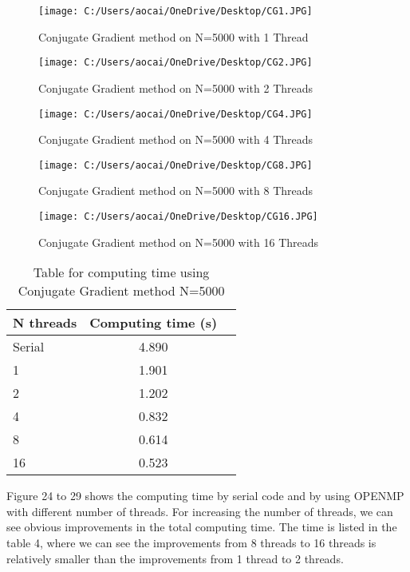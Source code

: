 \documentclass[12pt]{article}
\begin{document}
\begin{figure}[H]
	\centering
	\texttt{[image: C:/Users/aocai/OneDrive/Desktop/CG1.JPG]}
	\caption[Optional caption]{Conjugate Gradient method on N=5000 with 1 Thread}
	\label{fig:CG1}
\end{figure}

\begin{figure}[H]
	\centering
	\texttt{[image: C:/Users/aocai/OneDrive/Desktop/CG2.JPG]}
	\caption[Optional caption]{Conjugate Gradient method on N=5000 with 2 Threads}
	\label{fig:CG2}
\end{figure}

\begin{figure}[H]
	\centering
	\texttt{[image: C:/Users/aocai/OneDrive/Desktop/CG4.JPG]}
	\caption[Optional caption]{Conjugate Gradient method on N=5000 with 4 Threads}
	\label{fig:CG4}
\end{figure}

\begin{figure}[H]
	\centering
	\texttt{[image: C:/Users/aocai/OneDrive/Desktop/CG8.JPG]}
	\caption[Optional caption]{Conjugate Gradient method on N=5000 with 8 Threads}
	\label{fig:CG8}
\end{figure}
\begin{figure}[H]
	\centering
	\texttt{[image: C:/Users/aocai/OneDrive/Desktop/CG16.JPG]}
	\caption[Optional caption]{Conjugate Gradient method on N=5000 with 16 Threads}
	\label{fig:SOR16}
\end{figure}

\begin{table}[H]
	\centering
	\label{tab:sor}
	\begin{tabular}{lcr}
	\bfseries N {threads} & Computing time (s)\\ \hline
	Serial & 4.890\\
	1 & 1.901\\
	2 & 1.202\\
	4 & 0.832\\
	8 & 0.614\\
	16 & 0.523\\
	\end{tabular}
	\caption[This is optional caption, without reference]{Table for computing time using Conjugate Gradient method N=5000}
\end{table}

Figure 24 to 29 shows the computing time by serial code and by using OPENMP with different number of threads. For increasing the number of threads, we can see obvious improvements in the total computing time. The time is listed in the table 4, where we can see the improvements from 8 threads to 16 threads is relatively smaller than the improvements from 1 thread to 2 threads.\\
\end{document}
